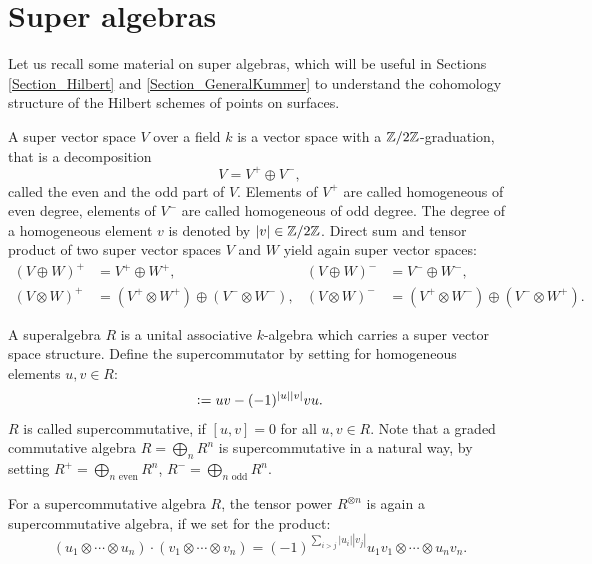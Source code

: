 \section{Super algebras} \label{SuperSection}
Let us recall some material on super algebras, which will be useful in Sections \ref{Section_Hilbert} and \ref{Section_GeneralKummer} to understand the cohomology structure of the Hilbert schemes of points on surfaces.
\begin{definition}
 A super vector space $V$ over a field $k$ is a vector space with a $\mathbb{Z}/2\mathbb{Z}$-graduation, that is a decomposition
$$
 V = V^{+} \oplus V^{-},
$$
called the even and the odd part of $V$. Elements of $V^{+}$ are called homogeneous of even degree, elements of $V^{-}$ are called homogeneous of odd degree.
The degree of a homogeneous element $v$ is denoted by $|v|\in \mathbb{Z}/2\mathbb{Z}$.
Direct sum and tensor product of two super vector spaces $V$ and $W$ yield again super vector spaces:
\begin{align*}
 (V\oplus W)^{+} &= V^{+}\oplus W^{+}, & (V\oplus W)^{-} &= V^{-}\oplus W^{-}, \\
 (V\!\otimes\! W)^{+} &= (V^{+}\!\otimes\! W^{+})\oplus (V^{-}\!\otimes\! W^{-}), & (V\!\otimes\! W)^{-} &=(V^{+}\!\otimes\! W^{-})\oplus (V^{-}\!\otimes\! W^{+}).
\end{align*}
\end{definition}
\begin{definition}
A superalgebra $R$ is a unital associative $k$-algebra which carries a super vector space structure. Define the supercommutator by setting for homogeneous elements $u,v \in R$:
\begin{align*}
[u,v] \defIs  uv - (-1)^{|u||v|} v u.
\end{align*}
$R$ is called supercommutative, if $[u,v]=0$ for all $u,v\in R$. Note that a graded commutative algebra $R = \bigoplus\limits_n R^n$ is supercommutative in a natural way, by setting $R^{+}=\bigoplus\limits_{n\text{ even}} R^n$, $R^{-}=\bigoplus\limits_{n\text{ odd}} R^n$.

For a supercommutative algebra $R$, the tensor power $R^{\otimes n}$ is again a supercommutative algebra, if we set for the product:
$$
(u_1\otimes\cdots\otimes u_n)\cdot(v_1\otimes\cdots\otimes v_n) 
=  (-1)^{\sum\limits_{i>j}|u_i||v_j|} u_1v_1\otimes\cdots\otimes u_nv_n.
$$
\end{definition}
